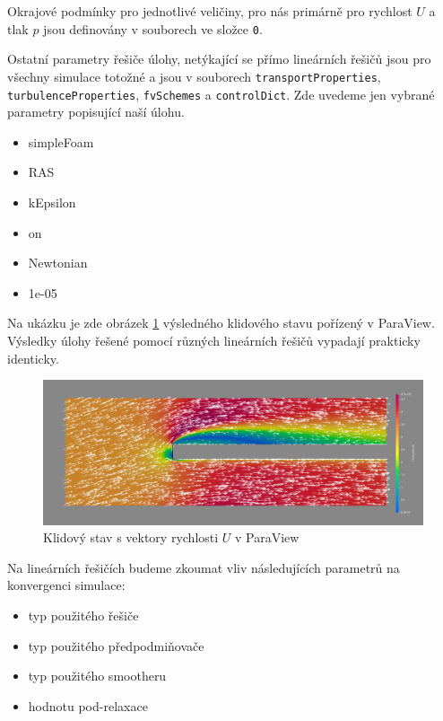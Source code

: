 \documentclass[a4paper,12pt]{report}
\theoremstyle{remark}
\begin{document}
Okrajové podmínky pro jednotlivé veličiny, pro nás primárně pro rychlost $U$ a tlak $p$  jsou definovány v souborech ve složce \texttt{0}.

Ostatní parametry řešiče úlohy, netýkající se přímo lineárních řešičů jsou pro všechny simulace totožné a jsou v souborech \texttt{transportProperties}, \texttt{turbulenceProperties}, \texttt{fvSchemes} a \texttt{controlDict}. Zde uvedeme jen vybrané parametry popisující naší úlohu.

\begin{itemize}
	\item{simpleFoam}
	\item{RAS}
	\item{kEpsilon}
	\item{on}
	\item{Newtonian}
	\item{1e-05}
\end{itemize}


	
Na ukázku je zde obrázek \ref{fig:pv-GAMG-GS} výsledného klidového stavu pořízený v ParaView. Výsledky úlohy řešené pomocí různých lineárních řešičů vypadají prakticky identicky.
	
	 \begin{figure}[H]
		\centering
		\includegraphics[width=1\linewidth]{pv-GAMG-GS.png}
		\caption{Klidový stav s vektory rychlosti $U$ v ParaView}
		\label{fig:pv-GAMG-GS}
	\end{figure}


Na lineárních řešičích budeme zkoumat vliv následujících parametrů na konvergenci simulace:
 
\begin{itemize}
	\item typ použitého řešiče
	\item typ použitého předpodmiňovače
	\item typ použitého smootheru
	\item hodnotu pod-relaxace
\end{itemize}
\end{document}
